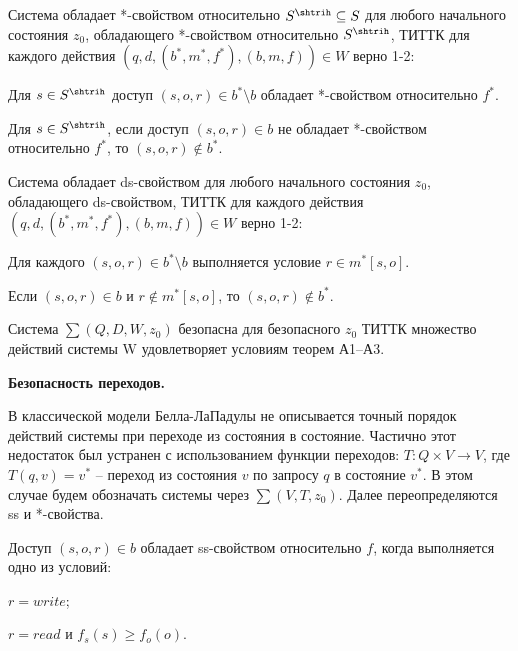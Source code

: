 \begin{proofs}[А2]
	Система обладает *-свойством относительно $S^{\shtrih} \subseteq S$ для любого начального состояния $z_0$, обладающего *-свойством относительно $S^{\shtrih}$, ТИТТК для каждого действия 
	$(q,d,(b^*,m^*,f^*), (b,m,f)) \in W$ верно 1-2:
	\begin{enumerate*}
		\item Для $s \in S^{\shtrih}$ доступ $(s,o,r) \in b^* \setminus b$ обладает *-свойством относительно $f^*$.
		\item Для $s \in S^{\shtrih}$, если доступ $(s,o,r) \in b$ не обладает *-свойством относительно $f^*$, то $(s,o,r) \notin b^*$.
	\end{enumerate*}
\end{proofs}

\begin{proofs}[А3]
	Система обладает ds-свойством для любого начального состояния $z_0$, обладающего ds-свойством, ТИТТК для каждого действия $(q,d,(b^*,m^*,f^*), (b,m,f)) \in W$ верно 1-2:
	\begin{enumerate*}
		\item Для каждого $(s,o,r) \in b^* \setminus b$ выполняется условие $r \in m^*[s,o]$.
		\item Если $(s,o,r) \in b$ и $r \notin m^*[s,o]$, то $(s,o,r) \notin b^*$.
	\end{enumerate*}
\end{proofs}

\begin{proofs}[БТБ]
	Система $\sum (Q,D,W,z_0)$ безопасна для безопасного $z_0$ ТИТТК множество действий системы W удовлетворяет условиям теорем А1--А3.
\end{proofs}

\textbf{Безопасность переходов.}

В классической модели Белла-ЛаПадулы не описывается точный порядок действий системы при переходе из состояния в состояние. Частично этот недостаток был устранен с использованием функции переходов:
$T: Q \times V \to V$, где $T(q,v) = v^*$ -- переход из состояния $v$ по запросу $q$ в состояние $v^*$. В этом случае будем обозначать системы через $\sum (V,T,z_0)$. Далее переопределяются ss и *-свойства.

\begin{defs}
	Доступ $(s,o,r) \in b$ обладает ss-свойством относительно $f$, когда выполняется одно из условий:
	\begin{itemize*}
		\item $r = write$;
		\item $r = read$ и $f_s(s) \geqslant f_o(o)$.
	\end{itemize*}
\end{defs}

